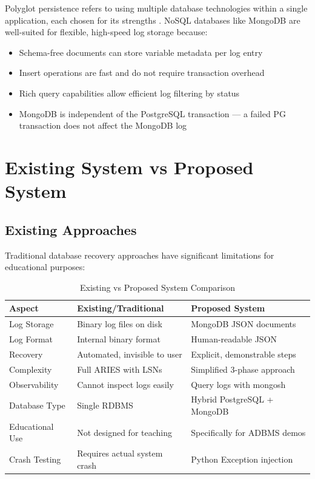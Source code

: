 Polyglot persistence refers to using multiple database technologies within
a single application, each chosen for its strengths \cite{fowler2012}.
NoSQL databases like MongoDB are well-suited for flexible, high-speed log
storage because:

\begin{itemize}
  \item Schema-free documents can store variable metadata per log entry
  \item Insert operations are fast and do not require transaction overhead
  \item Rich query capabilities allow efficient log filtering by status
  \item MongoDB is independent of the PostgreSQL transaction — a failed
        PG transaction does not affect the MongoDB log
\end{itemize}

\chapter{Existing System vs Proposed System}

\section{Existing Approaches}

Traditional database recovery approaches have significant limitations for
educational purposes:

\begin{table}[H]
\centering
\caption{Existing vs Proposed System Comparison}
\begin{tabularx}{\textwidth}{lXX}
\toprule
\textbf{Aspect} & \textbf{Existing/Traditional} & \textbf{Proposed System} \\
\midrule
Log Storage & Binary log files on disk & MongoDB JSON documents \\
Log Format & Internal binary format & Human-readable JSON \\
Recovery & Automated, invisible to user & Explicit, demonstrable steps \\
Complexity & Full ARIES with LSNs & Simplified 3-phase approach \\
Observability & Cannot inspect logs easily & Query logs with mongosh \\
Database Type & Single RDBMS & Hybrid PostgreSQL + MongoDB \\
Educational Use & Not designed for teaching & Specifically for ADBMS demos \\
Crash Testing & Requires actual system crash & Python Exception injection \\
\bottomrule
\end{tabularx}
\end{table}

